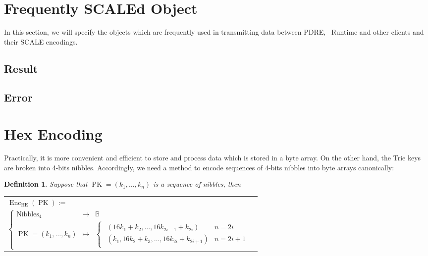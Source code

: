 \documentclass{book}
\newcommand{\assign}{:=}
\newcommand{\tmop}[1]{\ensuremath{\operatorname{#1}}}
\newtheorem{definition}{Definition}
\newtheorem{definition}{Definition}
\begin{document}
\section{Frequently SCALEd Object}

In this section, we will specify the objects which are frequently used in
transmitting data between PDRE, \ Runtime and other clients and their SCALE
encodings.

\subsection{Result}

{}

\subsection{Error}

{}

\section{Hex Encoding}

Practically, it is more convenient and efficient to store and process data
which is stored in a byte array. On the other hand, the Trie keys are broken
into 4-bits nibbles. Accordingly, we need a method to encode sequences of
4-bits nibbles into byte arrays canonically:

\begin{definition}
  \label{defn-hex-encoding}Suppose that $\tmop{PK} = (k_1, \ldots, k_n)$ is a
  sequence of nibbles, then
  
  \begin{tabular}{l}
    $\tmop{Enc}_{\tmop{HE}} (\tmop{PK}) \assign$\\
    $\left\{ \begin{array}{lll}
      \tmop{Nibbles}_4 & \rightarrow & \mathbb{B}\\
      \tmop{PK} = (k_1, \ldots, k_n) & \mapsto & \left\{ \begin{array}{l}
        \begin{array}{ll}
          (16 k_1 + k_2, \ldots, 16 k_{2 i - 1} + k_{2 i}) & n = 2 i\\
          (k_1, 16 k_2 + k_3, \ldots, 16 k_{2 i} + k_{2 i + 1}) & n = 2 i + 1
        \end{array}
      \end{array} \right.
    \end{array} \right.$
  \end{tabular}
\end{definition}
\end{document}
